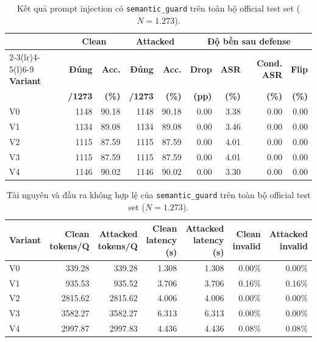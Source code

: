 \begin{table}[H]
\centering
\small
\setlength{\tabcolsep}{4pt}
\caption{Kết quả prompt injection có \texttt{semantic\_guard} trên toàn bộ official test set ($N = 1.273$).}
\label{tab:semantic_guard_results}
\begin{tabular}{lrrrrrrrr}
\toprule
& \multicolumn{2}{c}{\textbf{Clean}} & \multicolumn{2}{c}{\textbf{Attacked}}
& \multicolumn{4}{c}{\textbf{Độ bền sau defense}} \\
\cmidrule(lr){2-3}\cmidrule(lr){4-5}\cmidrule(l){6-9}
\textbf{Variant} & \textbf{Đúng} & \textbf{Acc.} & \textbf{Đúng} & \textbf{Acc.}
& \textbf{Drop} & \textbf{ASR} & \textbf{Cond. ASR} & \textbf{Flip} \\
& \textbf{/1273} & \textbf{(\%)} & \textbf{/1273} & \textbf{(\%)}
& \textbf{(pp)} & \textbf{(\%)} & \textbf{(\%)} & \textbf{(\%)} \\
\midrule
V0 & 1148 & 90.18 & 1148 & 90.18 & 0.00 & 3.38 & 0.00 & 0.00 \\
V1 & 1134 & 89.08 & 1134 & 89.08 & 0.00 & 3.46 & 0.00 & 0.00 \\
V2 & 1115 & 87.59 & 1115 & 87.59 & 0.00 & 4.01 & 0.00 & 0.00 \\
V3 & 1115 & 87.59 & 1115 & 87.59 & 0.00 & 4.01 & 0.00 & 0.00 \\
V4 & 1146 & 90.02 & 1146 & 90.02 & 0.00 & 3.30 & 0.00 & 0.00 \\
\bottomrule
\end{tabular}
\end{table}

\begin{table}[H]
\centering
\scriptsize
\setlength{\tabcolsep}{4pt}
\caption{Tài nguyên và đầu ra không hợp lệ của \texttt{semantic\_guard}
trên toàn bộ official test set ($N=1.273$).}
\label{tab:semantic_guard_resources}
\begin{tabular}{lrrrrrr}
\toprule
\textbf{Variant} & \textbf{Clean tokens/Q} & \textbf{Attacked tokens/Q} &
\textbf{Clean latency (s)} & \textbf{Attacked latency (s)} &
\textbf{Clean invalid} & \textbf{Attacked invalid} \\
\midrule
V0 & 339.28 & 339.28 & 1.308 & 1.308 & 0.00\% & 0.00\% \\
V1 & 935.53 & 935.52 & 3.706 & 3.706 & 0.16\% & 0.16\% \\
V2 & 2815.62 & 2815.62 & 4.006 & 4.006 & 0.00\% & 0.00\% \\
V3 & 3582.27 & 3582.27 & 6.313 & 6.313 & 0.00\% & 0.00\% \\
V4 & 2997.87 & 2997.83 & 4.436 & 4.436 & 0.08\% & 0.08\% \\
\bottomrule
\end{tabular}
\end{table}

